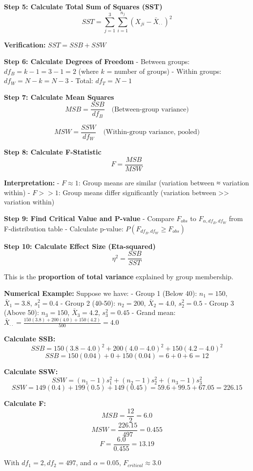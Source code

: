 \documentclass[11pt]{article}
\begin{document}
\textbf{Step 5: Calculate Total Sum of Squares (SST)}
\[SST = \sum_{j=1}^{3}\sum_{i=1}^{n_j}(X_{ji} - \bar{X}_{\cdot\cdot})^2\]

\textbf{Verification:} \(SST = SSB + SSW\)

\textbf{Step 6: Calculate Degrees of Freedom} - Between groups:
\(df_B = k - 1 = 3 - 1 = 2\) (where \(k\) = number of groups) - Within
groups: \(df_W = N - k = N - 3\) - Total: \(df_T = N - 1\)

\textbf{Step 7: Calculate Mean Squares}
\[MSB = \frac{SSB}{df_B} \quad \text{(Between-group variance)}\]

\[MSW = \frac{SSW}{df_W} \quad \text{(Within-group variance, pooled)}\]

\textbf{Step 8: Calculate F-Statistic} \[F = \frac{MSB}{MSW}\]

\textbf{Interpretation:} - \(F \approx 1\): Group means are similar
(variation between ≈ variation within) - \(F >> 1\): Group means differ
significantly (variation between \textgreater\textgreater{} variation
within)

\textbf{Step 9: Find Critical Value and P-value} - Compare \(F_{obs}\)
to \(F_{\alpha, df_B, df_W}\) from F-distribution table - Calculate
p-value: \(P(F_{df_B, df_W} \geq F_{obs})\)

\textbf{Step 10: Calculate Effect Size (Eta-squared)}
\[\eta^2 = \frac{SSB}{SST}\]

This is the \textbf{proportion of total variance} explained by group
membership.

\textbf{Numerical Example:} Suppose we have: - Group 1 (Below 40):
\(n_1 = 150\), \(\bar{X}_1 = 3.8\), \(s_1^2 = 0.4\) - Group 2 (40-50):
\(n_2 = 200\), \(\bar{X}_2 = 4.0\), \(s_2^2 = 0.5\) - Group 3 (Above
50): \(n_3 = 150\), \(\bar{X}_3 = 4.2\), \(s_3^2 = 0.45\) - Grand mean:
\(\bar{X}_{\cdot\cdot} = \frac{150(3.8) + 200(4.0) + 150(4.2)}{500} = 4.0\)

\textbf{Calculate SSB:}
\[SSB = 150(3.8-4.0)^2 + 200(4.0-4.0)^2 + 150(4.2-4.0)^2\]
\[SSB = 150(0.04) + 0 + 150(0.04) = 6 + 0 + 6 = 12\]

\textbf{Calculate SSW:}
\[SSW = (n_1-1)s_1^2 + (n_2-1)s_2^2 + (n_3-1)s_3^2\]
\[SSW = 149(0.4) + 199(0.5) + 149(0.45) = 59.6 + 99.5 + 67.05 = 226.15\]

\textbf{Calculate F:} \[MSB = \frac{12}{2} = 6.0\]
\[MSW = \frac{226.15}{497} = 0.455\] \[F = \frac{6.0}{0.455} = 13.19\]

With \(df_1 = 2, df_2 = 497\), and \(\alpha = 0.05\),
\(F_{critical} \approx 3.0\)
\end{document}
